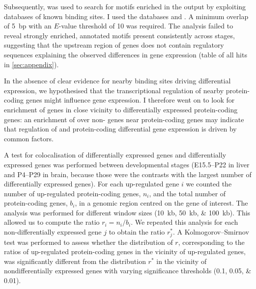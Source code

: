 Subsequently,  \citep{Gupta:2007} was used to search for motifs
enriched in the  output by exploiting databases of known \tf binding
sites. I used the databases  and
. A minimum overlap of \SI{5}{bp} with an
\(E\)-value threshold of \num{10} was required. The analysis failed to reveal
strongly enriched, annotated motifs present consistently across stages,
suggesting that the upstream region of \trna genes does not contain regulatory
sequences explaining the observed differences in \trna gene expression (table of
all hits in \cref{sec:appendix}).

In the absence of clear evidence for nearby \tf binding sites driving
differential expression, we hypothesised that the transcriptional regulation of
nearby protein-coding genes might influence \trna gene expression. I therefore
went on to look for enrichment of \de \trna genes in close vicinity to
differentially expressed protein-coding genes: an enrichment of \de over non-\de
\trna genes near \de protein-coding genes may indicate that regulation of \trna
and protein-coding differential gene expression is driven by common factors.

A test for colocalisation of differentially expressed \trna genes and
differentially expressed \mrna genes was performed between developmental stages
(E15.5–P22 in liver and P4–P29 in brain, because those were the contrasts with
the largest number of differentially expressed \trna genes). For each
up-regulated \trna gene \(i\) we counted the number of up-regulated
protein-coding genes, \(n_i\), and the total number of protein-coding genes,
\(b_i\), in a genomic region centred on the \trna gene of interest. The analysis
was performed for different window sizes (\SIlist{10;50;100}{kb}). This allowed
us to compute the ratio \(r_i = {n_i}/{b_i}\). We repeated this analysis for
each non-differentially expressed \trna gene \(j\) to obtain the ratio
\(r_j^*\). A Kolmogorov–Smirnov test was performed to assess whether the
distribution of \(r\), corresponding to the ratios of up-regulated
protein-coding genes in the vicinity of up-regulated \trna genes, was
significantly different from the distribution \(r^*\) in the vicinity of
nondifferentially expressed \trna genes with varying significance thresholds
(\numlist{0.1;0.05;0.01}).

